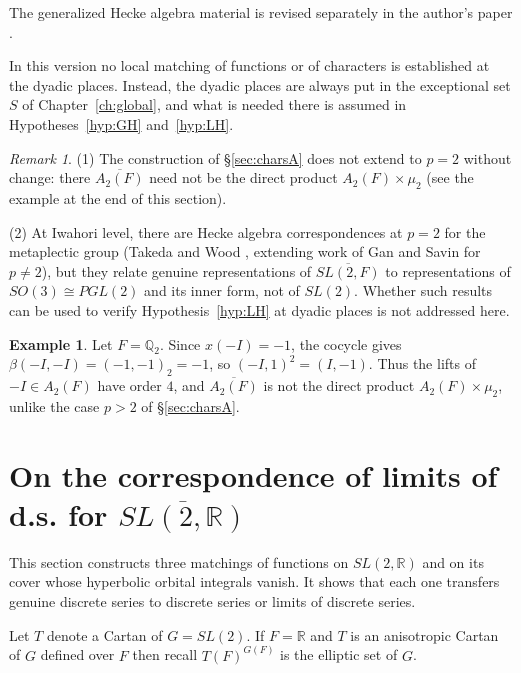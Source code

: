 \documentclass[12pt,letterpaper]{book}
\theoremstyle{plain}
\theoremstyle{definition}
\newtheorem{example}[theorem]{Example}
\theoremstyle{remark}
\newtheorem{remark}[theorem]{Remark}
\theoremstyle{remark}
\begin{document}
The generalized Hecke algebra material is revised separately in the
author's paper \cite{J3}.

In this version no local matching of functions or of characters is
established at the dyadic places. Instead, the dyadic places are always
put in the exceptional set $S$ of Chapter~\ref{ch:global}, and what is
needed there is assumed in Hypotheses~\ref{hyp:GH} and~\ref{hyp:LH}.

\begin{remark}
(1) The construction of \S\ref{sec:charsA} does not extend to $p=2$
without change: there $\overline{A_2(F)}$ need not be the direct product
$A_2(F)\times\mu_2$ (see the example at the end of this section).

(2) At Iwahori level, there are Hecke algebra correspondences at
$p=2$ for the metaplectic group (Takeda and Wood \cite{TW}, extending
work of Gan and Savin for $p\neq 2$), but they relate genuine
representations of $\overline{SL(2,F)}$ to representations of
$SO(3)\cong PGL(2)$ and its inner form, not of $SL(2)$. Whether such
results can be used to verify Hypothesis~\ref{hyp:LH} at dyadic places
is not addressed here.
\end{remark}




\begin{example}
Let $F={\mathbb Q}_2$. Since $x(-I)=-1$, the cocycle gives
$\beta(-I,-I)=(-1,-1)_2=-1$, so $(-I,1)^2=(I,-1)$. Thus the lifts of
$-I\in A_2(F)$ have order $4$, and $\overline{A_2(F)}$ is not the direct
product $A_2(F)\times\mu_2$, unlike the case $p>2$ of \S\ref{sec:charsA}.
\end{example}

\section{On the correspondence of limits of d.s. for
\texorpdfstring{$\overline{SL(2,\mathbb{R})}$}{SL(2,R)-bar}}\label{sec:realds}

This section constructs three matchings of functions on $SL(2,{\mathbb R})$ and on its cover whose hyperbolic orbital integrals vanish. It shows that each one transfers genuine discrete series to discrete series or limits of discrete series.


Let $T$ denote a Cartan of $G=SL(2)$.
If $F={\mathbb{R}}$ and $T$ is an
anisotropic Cartan of $G$ defined over $F$ then recall $T(F)^{G(F)}$ is the
elliptic set of $G$.
\end{document}
